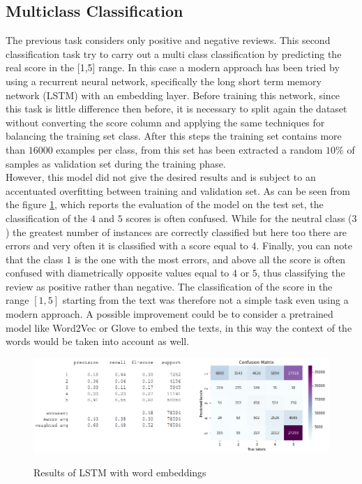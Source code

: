 \documentclass[11pt]{article}
\begin{document}
\subsection{Multiclass Classification}
The previous task considers only positive and negative reviews. This second classification task try to carry out a multi class classification by predicting the real score in the [1,5] range.
In this case a modern approach has been tried by using a recurrent neural network, specifically the long short term memory network (LSTM) with an embedding layer. Before training this network, since this task is little difference then before, it is necessary to split again the dataset without converting the score column and applying the same techniques for balancing the training set class. After this steps the training set contains  more than $16000$ examples per class, from this set has been extracted a random $10\%$ of samples as validation set during the training phase.\\
However, this model did not give the desired results and is subject to an accentuated overfitting between training and validation set. As can be seen from the figure \ref{lstm}, which reports the evaluation of the model on the test set, the classification of the $4$ and $5$ scores is often confused. While for the neutral class ($3$) the greatest number of instances are correctly classified but here too there are errors and very often it is classified with a score equal to $4$. Finally, you can note that the class $1$ is the one with the most errors, and above all the score is often confused with diametrically opposite values equal to $4$ or $5$, thus classifying the review as positive rather than negative. The classification of the score in the range $[1,5]$ starting from the text was therefore not a simple task even using a modern approach. A possible improvement could be to consider a pretrained model like Word2Vec or Glove to embed the texts, in this way the context of the words would be taken into account as well. 
\begin{figure}[H]
\begin{center}
  \includegraphics[scale = 0.6]{img/LSTM.png}\\
  \caption{Results of LSTM with word embeddings}
  \label{lstm}
\end{center}
\end{figure}
\end{document}
